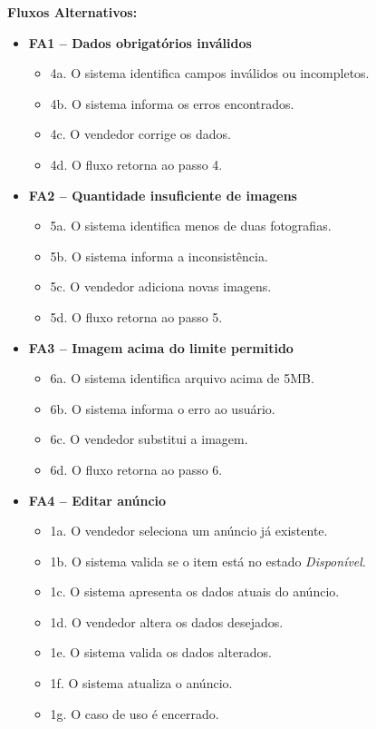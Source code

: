\documentclass[
	article,			%
	11pt,				%
	oneside,			%
	a4paper,			%
	english,			%
	brazil,				%
	sumario=tradicional
	]{abntex2}
\begin{document}
\vspace{0.5em}
\noindent\textbf{Fluxos Alternativos:}
\begin{itemize}[leftmargin=*]
    \item \textbf{FA1 – Dados obrigatórios inválidos}
    \begin{itemize}[label={}, leftmargin=0.5cm]
        \item 4a. O sistema identifica campos inválidos ou incompletos.
        \item 4b. O sistema informa os erros encontrados.
        \item 4c. O vendedor corrige os dados.
        \item 4d. O fluxo retorna ao passo 4.
    \end{itemize}
    
    \item \textbf{FA2 – Quantidade insuficiente de imagens}
    \begin{itemize}[label={}, leftmargin=0.5cm]
        \item 5a. O sistema identifica menos de duas fotografias.
        \item 5b. O sistema informa a inconsistência.
        \item 5c. O vendedor adiciona novas imagens.
        \item 5d. O fluxo retorna ao passo 5.
    \end{itemize}

    \item \textbf{FA3 – Imagem acima do limite permitido}
    \begin{itemize}[label={}, leftmargin=0.5cm]
        \item 6a. O sistema identifica arquivo acima de 5MB.
        \item 6b. O sistema informa o erro ao usuário.
        \item 6c. O vendedor substitui a imagem.
        \item 6d. O fluxo retorna ao passo 6.
    \end{itemize}

    \item \textbf{FA4 – Editar anúncio}
    \begin{itemize}[label={}, leftmargin=0.5cm]
        \item 1a. O vendedor seleciona um anúncio já existente.
        \item 1b. O sistema valida se o item está no estado \textit{Disponível}.
        \item 1c. O sistema apresenta os dados atuais do anúncio.
        \item 1d. O vendedor altera os dados desejados.
        \item 1e. O sistema valida os dados alterados.
        \item 1f. O sistema atualiza o anúncio.
        \item 1g. O caso de uso é encerrado.
    \end{itemize}


\end{itemize}
\end{document}
